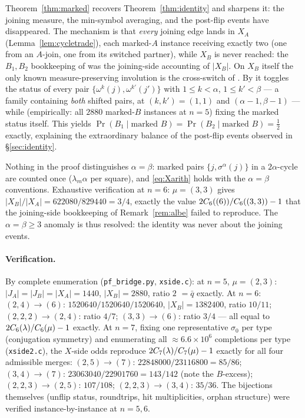 \begin{remark}
Theorem~\ref{thm:marked} recovers Theorem~\ref{thm:identity} and
sharpens it: the joining measure, the min-symbol averaging, and the
post-flip events have disappeared.  The mechanism is that
\emph{every} joining edge lands in $X_A$ (Lemma~\ref{lem:cycletrade}),
each marked-$A$ instance receiving exactly two (one from an $A$-join,
one from its switched partner), while $X_B$ is never reached: the
$B_1,B_2$ bookkeeping of \cite{CGW08} was the joining-side accounting
of $|X_B|$.  On $X_B$ itself the only known measure-preserving
involution is the cross-switch of \cite[Def.~3.9]{CGW08}.  By
\cite[Lem.~3.10]{CGW08} it toggles the status of every pair
$\{\omega^{k}(j),\omega^{k'}(j')\}$ with $1\le k<\alpha$,
$1\le k'<\beta$ --- a family containing \emph{both} shifted pairs, at
$(k,k')=(1,1)$ and $(\alpha-1,\beta-1)$ --- while (empirically: all
$2880$ marked-$B$ instances at $n=5$) fixing the marked status
itself.  This yields
$\Pr(B_1\mid\text{marked }B)=\Pr(B_2\mid\text{marked }B)=\tfrac12$
exactly, explaining the extraordinary balance of the post-flip events
observed in \S\ref{sec:identity}.
\end{remark}

\begin{remark}[the case $\alpha=\beta$, and Remark~\ref{rem:albe}]
Nothing in the proof distinguishes $\alpha=\beta$: marked pairs
$\{j,\sigma^\alpha(j)\}$ in a $2\alpha$-cycle are counted once
($\lambda_m\alpha$ per square), and \eqref{eq:Xarith} holds with the
$\alpha=\beta$ conventions.  Exhaustive verification at $n=6$:
$\mu=(3,3)$ gives $|X_B|/|X_A|=622080/829440=3/4$, exactly the value
$2C_6((6))/C_6((3,3))-1$ that the joining-side bookkeeping of
Remark~\ref{rem:albe} failed to reproduce.  The $\alpha=\beta\ge3$
anomaly is thus resolved: the identity was never about the joining
events.
\end{remark}

\paragraph{Verification.}  By complete enumeration
(\texttt{pf\_bridge.py}, \texttt{xside.c}): at $n=5$,
$\mu=(2,3)$: $|J_A|=|J_B|=|X_A|=1440$, $|X_B|=2880$, ratio $2$
$=\bar q$ exactly.  At $n=6$: $(2,4)\to(6)$:
$1520640/1520640/1520640$, $|X_B|=1382400$, ratio $10/11$;
$(2,2,2)\to(2,4)$: ratio $4/7$; $(3,3)\to(6)$: ratio $3/4$ --- all
equal to $2C_6(\lambda)/C_6(\mu)-1$ exactly.  At $n=7$, fixing one
representative $\sigma_0$ per type (conjugation symmetry) and
enumerating all $\approx6.6\times10^6$ completions per type
(\texttt{xside2.c}), the $X$-side odds reproduce
$2C_7(\lambda)/C_7(\mu)-1$ exactly for all four admissible merges:
$(2,5)\to(7)$: $22848000/23116800=85/86$;
$(3,4)\to(7)$: $23063040/22901760=143/142$ (note the $B$-excess);
$(2,2,3)\to(2,5)$: $107/108$; $(2,2,3)\to(3,4)$: $35/36$.
The bijections themselves
(unflip status, roundtrips, hit multiplicities, orphan structure) were
verified instance-by-instance at $n=5,6$.

